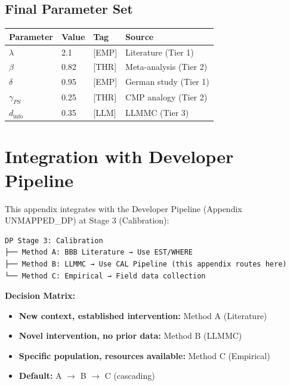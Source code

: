 \subsection{Final Parameter Set}

\begin{center}
\begin{tabular}{llll}
\toprule
\textbf{Parameter} & \textbf{Value} & \textbf{Tag} & \textbf{Source} \\
\midrule
$\lambda$ & 2.1 & [EMP] & Literature (Tier 1) \\
$\beta$ & 0.82 & [THR] & Meta-analysis (Tier 2) \\
$\delta$ & 0.95 & [EMP] & German study (Tier 1) \\
$\gamma_{PS}$ & 0.25 & [THR] & CMP analogy (Tier 2) \\
$d_{\text{info}}$ & 0.35 & [LLM] & LLMMC (Tier 3) \\
\bottomrule
\end{tabular}
\end{center}


\section{Integration with Developer Pipeline}
\label{sec:pm-integration}

This appendix integrates with the Developer Pipeline (Appendix UNMAPPED_DP) at Stage 3 (Calibration):

\begin{verbatim}
DP Stage 3: Calibration
├── Method A: BBB Literature → Use EST/WHERE
├── Method B: LLMMC → Use CAL Pipeline (this appendix routes here)
└── Method C: Empirical → Field data collection
\end{verbatim}

\textbf{Decision Matrix:}
\begin{itemize}[nosep]
    \item \textbf{New context, established intervention:} Method A (Literature)
    \item \textbf{Novel intervention, no prior data:} Method B (LLMMC)
    \item \textbf{Specific population, resources available:} Method C (Empirical)
    \item \textbf{Default:} A $\rightarrow$ B $\rightarrow$ C (cascading)
\end{itemize}

